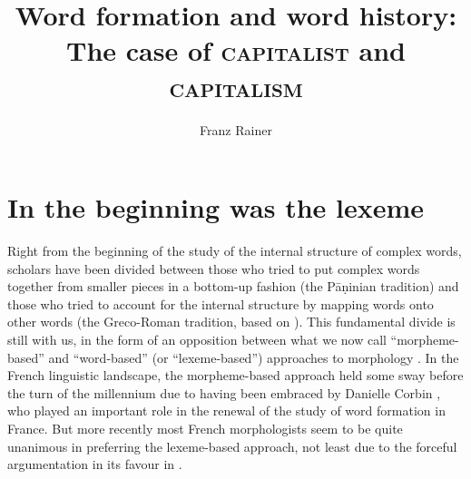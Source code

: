 \documentclass[output=paper]{langsci/langscibook}
\title{\texorpdfstring{Word formation and word history:\\ The case of 
 \textsc{capitalist} and \textsc{capitalism}}{Word formation and word history:  CAPITALIST and 
CAPITALISM}}
\author{Franz Rainer \affiliation{WU Vienna}}
\begin{document}



\section{In the beginning was the lexeme}

Right from the beginning of the study of the internal structure of
complex words, scholars have been divided between those who tried to put
complex words together from smaller pieces in a bottom-up fashion (the
Pāṇinian tradition) and those who tried to account for the internal
structure by mapping words onto other words (the Greco-Roman tradition,
based on ). This fundamental divide is still with us, in the form
of an opposition between what we now call ``morpheme-based''
and
``word-based'' (or ``lexeme-based'') approaches
to morphology %
\citep[see][]{Aronoff2007}%
%
. In the French linguistic landscape, the morpheme-based
approach held some sway before the turn of the millennium due to having been embraced by Danielle Corbin %
\citep[see][]{Corbin87}%
%
, who played an
important role in the renewal of the study of word formation in France.
But more recently most French morphologists seem to be quite unanimous
in preferring the lexeme-based approach, not least due to the forceful
argumentation in its favour in %
\citet{Fradin03}%
%
.
\end{document}
